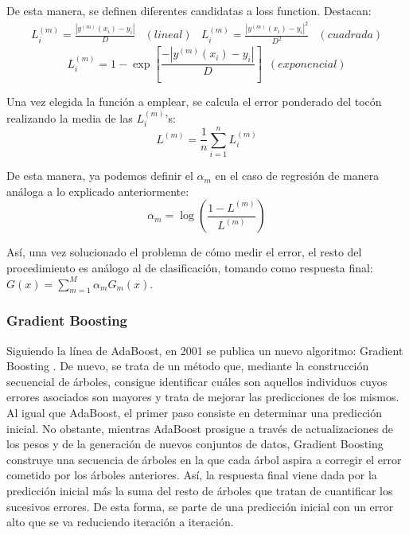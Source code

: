 \documentclass[12pt,twoside]{article}
\begin{document}
De esta manera, se definen diferentes candidatas a loss function. Destacan:
\begin{equation*}
\begin{array}{cr|cr}
L_i^{(m)} = \frac{|y^{(m)}(x_i) - y_i|}{D} & (lineal) & L_i^{(m)} = \frac{|y^{(m)}(x_i) - y_i|^2}{D^2} & (cuadrada) 
\end{array}
\end{equation*}
\begin{equation*}
L_i^{(m)} = 1 - \exp \left[ \frac{-|y^{(m)}(x_i) - y_i|}{D} \right] \, \, \, (exponencial)
\end{equation*}

Una vez elegida la función a emplear, se calcula el error ponderado del tocón realizando la media de las $L_i^{(m)}$'s:
\begin{equation*}
L^{(m)} = \frac{1}{n}\sum_{i=1}^n L_i^{(m)}
\end{equation*}

De esta manera, ya podemos definir el $\alpha_m$ en el caso de regresión de manera análoga a lo explicado anteriormente:
\begin{equation*}
\alpha_m = \log \left( \frac{1 - L^{(m)}}{L^{(m)}} \right)
\end{equation*}

Así, una vez solucionado el problema de cómo medir el error, el resto del procedimiento es análogo al de clasificación, tomando como respuesta final: $G(x) = \sum_{m = 1} ^M \alpha_m G_m(x)$.





\subsubsection{Gradient Boosting} \label{sec:GB}

Siguiendo la línea de AdaBoost, en 2001 se publica un nuevo algoritmo: Gradient Boosting \cite{FR03}. De nuevo, se trata de un método que, mediante la construcción secuencial de árboles, consigue identificar cuáles son aquellos individuos cuyos errores asociados son mayores y trata de mejorar las predicciones de los mismos. Al igual que AdaBoost, el primer paso consiste en determinar una predicción inicial. No obstante, mientras AdaBoost prosigue a través de actualizaciones de los pesos y de la generación de nuevos conjuntos de datos, Gradient Boosting construye una secuencia de árboles en la que cada árbol aspira a corregir el error cometido por los árboles anteriores. Así, la respuesta final viene dada por la predicción inicial más la suma del resto de árboles que tratan de cuantificar los sucesivos errores. De esta forma, se parte de una predicción inicial con un error alto que se va reduciendo iteración a iteración.
\end{document}
